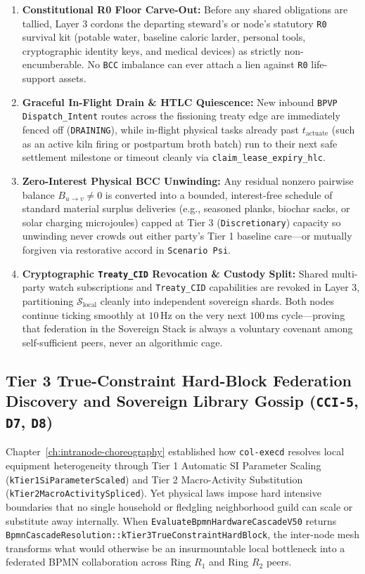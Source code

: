 \begin{enumerate}
    \item \textbf{Constitutional R0 Floor Carve-Out:} Before any shared obligations are tallied,
    Layer 3 cordons the departing steward's or node's statutory \texttt{R0} survival kit
    (potable water, baseline caloric larder, personal tools, cryptographic identity keys, and
    medical devices) as strictly non-encumberable. No \texttt{BCC} imbalance can ever attach a
    lien against \texttt{R0} life-support assets.
    \item \textbf{Graceful In-Flight Drain \& HTLC Quiescence:} New inbound \texttt{BPVP}
    \texttt{Dispatch\_Intent} routes across the fissioning treaty edge are immediately fenced
    off (\texttt{DRAINING}), while in-flight physical tasks already past $t_{\mathrm{actuate}}$
    (such as an active kiln firing or postpartum broth batch) run to their next safe settlement
    milestone or timeout cleanly via \texttt{claim\_lease\_expiry\_hlc}.
    \item \textbf{Zero-Interest Physical BCC Unwinding:} Any residual nonzero pairwise balance
    $B_{u \to v} \neq 0$ is converted into a bounded, interest-free schedule of standard
    material surplus deliveries (e.g., seasoned planks, biochar sacks, or solar charging
    microjoules) capped at Tier 3 (\texttt{Discretionary}) capacity so unwinding never crowds
    out either party's Tier 1 baseline care---or mutually forgiven via restorative accord in
    \texttt{Scenario Psi}.
    \item \textbf{Cryptographic \texttt{Treaty\_CID} Revocation \& Custody Split:} Shared
    multi-party watch subscriptions and \texttt{Treaty\_CID} capabilities are revoked in Layer 3,
    partitioning $\mathcal{S}_{\mathrm{local}}$ cleanly into independent sovereign shards. Both
    nodes continue ticking smoothly at $10\,\mathrm{Hz}$ on the very next $100\,\mathrm{ms}$
    cycle---proving that federation in the Sovereign Stack is always a voluntary covenant among
    self-sufficient peers, never an algorithmic cage.
\end{enumerate}

\subsection{Tier 3 True-Constraint Hard-Block Federation Discovery and Sovereign Library Gossip (\texttt{CCI-5}, \texttt{D7}, \texttt{D8})}
\label{subsec:tier3-federation-and-library-gossip}

Chapter~\ref{ch:intranode-choreography} established how \texttt{col-execd} resolves local equipment heterogeneity through Tier 1 Automatic SI Parameter Scaling (\texttt{kTier1SiParameterScaled}) and Tier 2 Macro-Activity Substitution (\texttt{kTier2MacroActivitySpliced}). Yet physical laws impose hard intensive boundaries that no single household or fledgling neighborhood guild can scale or substitute away internally. When \texttt{EvaluateBpmnHardwareCascadeV50} returns \texttt{BpmnCascadeResolution::kTier3TrueConstraintHardBlock}, the inter-node mesh transforms what would otherwise be an insurmountable local bottleneck into a federated BPMN collaboration across Ring $R_1$ and Ring $R_2$ peers.

